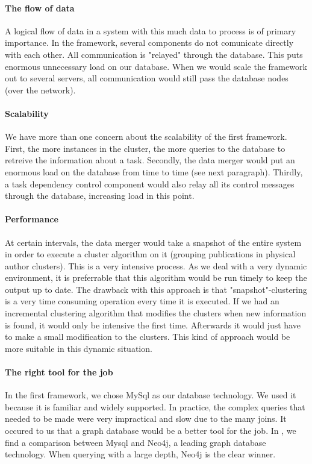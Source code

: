 \paragraph{The flow of data} A logical flow of data in a system with this much data to process is of primary importance. In the framework, several components do not comunicate directly with each other. All communication is "relayed" through the database. This puts enormous unnecessary load on our database. When we would scale the framework out to several servers, all communication would still pass the database nodes (over the network).

\paragraph{Scalability} We have more than one concern about the scalability of the first framework. First, the more instances in the cluster, the more queries to the database to retreive the information about a task. Secondly, the data merger would put an enormous load on the database from time to time (see next paragraph). Thirdly, a task dependency control component would also relay all its control messages through the database, increasing load in this point.

\paragraph{Performance} At certain intervals, the data merger would take a snapshot of the entire system in order to execute a cluster algorithm on it (grouping publications in physical author clusters). This is a very intensive process. As we deal with a very dynamic environment, it is preferrable that this algorithm would be run timely to keep the output up to date. The drawback with this approach is that "snapshot"-clustering is a very time consuming operation every time it is executed. If we had an incremental clustering algorithm that modifies the clusters when new information is found, it would only be intensive the first time. Afterwards it would just have to make a small modification to the clusters. This kind of approach would be more suitable in this dynamic situation.

\paragraph{The right tool for the job} In the first framework, we chose MySql as our database technology. We used it because it is familiar and widely supported. In practice, the complex queries that needed to be made were very impractical and slow due to the many joins. It occured to us that a graph database would be a better tool for the job. In \cite{vicknair2010comparison}, we find a comparison between Mysql and Neo4j, a leading graph database technology. When querying with a large depth, Neo4j is the clear winner.

